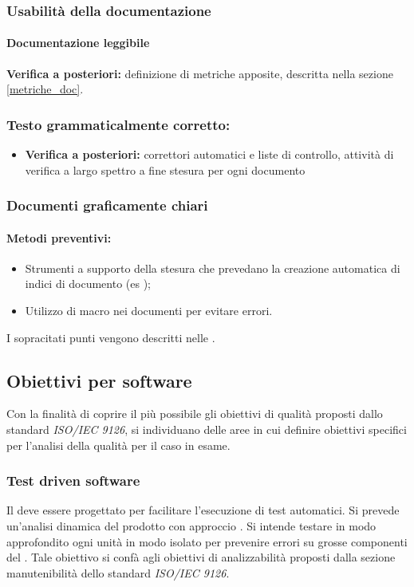 \documentclass[12pt,a4paper]{article}
\begin{document}
\subsubsection{Usabilità della documentazione}
\paragraph{Documentazione leggibile}
\textbf{Verifica a posteriori:}  definizione di metriche apposite, descritta nella sezione \ref{metriche_doc}.

\subsubsection{Testo grammaticalmente corretto:}
\begin{itemize}
	\item \textbf{Verifica a posteriori:} correttori automatici e liste di controllo, attività di verifica a largo spettro a fine stesura per ogni documento
\end{itemize}

\subsubsection{Documenti graficamente chiari}
\paragraph{Metodi preventivi:}
\begin{itemize}
	\item Strumenti a supporto della stesura che prevedano la creazione automatica di indici di documento (es \latex);
	\item Utilizzo di macro nei documenti per evitare errori.
\end{itemize}
I sopracitati punti vengono descritti nelle \NdP{}.


\subsection{Obiettivi per software}

Con la finalità di coprire il più possibile gli obiettivi di qualità proposti dallo standard  \textit{ISO/IEC 9126}, si individuano delle aree in cui definire obiettivi specifici per l'analisi della qualità  per il caso in esame.
\subsubsection{Test driven software}
Il  deve essere progettato per facilitare l'esecuzione di test automatici. Si prevede un'analisi dinamica del prodotto con approccio . Si intende testare in modo approfondito ogni unità  in modo isolato per prevenire errori su grosse componenti del . Tale obiettivo si confà agli obiettivi di analizzabilità proposti dalla sezione manutenibilità dello standard \textit{ISO/IEC 9126}.
\end{document}
